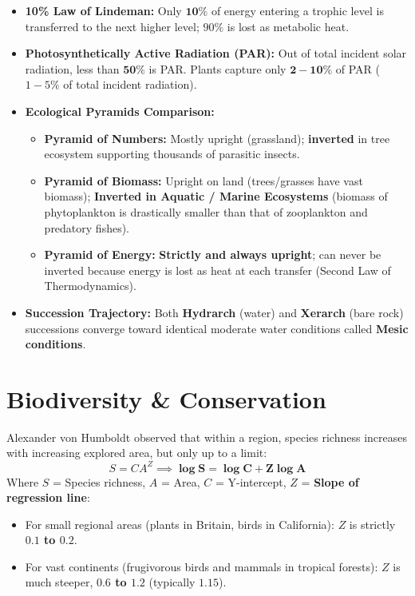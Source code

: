 \documentclass[10pt,a4paper]{article}
\begin{document}
\begin{conceptbox}
\begin{itemize}
  \item \textbf{10\% Law of Lindeman:} Only $\mathbf{10\%}$ of energy entering a trophic level is transferred to the next higher level; $90\%$ is lost as metabolic heat.
  \item \textbf{Photosynthetically Active Radiation (PAR):} Out of total incident solar radiation, less than $\mathbf{50\%}$ is PAR. Plants capture only $\mathbf{2-10\%}$ of PAR ($1-5\%$ of total incident radiation).
  \item \textbf{Ecological Pyramids Comparison:}
  \begin{itemize}
    \item \textbf{Pyramid of Numbers:} Mostly upright (grassland); \textbf{inverted} in tree ecosystem supporting thousands of parasitic insects.
    \item \textbf{Pyramid of Biomass:} Upright on land (trees/grasses have vast biomass); \textbf{Inverted in Aquatic / Marine Ecosystems} (biomass of phytoplankton is drastically smaller than that of zooplankton and predatory fishes).
    \item \textbf{Pyramid of Energy:} \textbf{Strictly and always upright}; can never be inverted because energy is lost as heat at each transfer (Second Law of Thermodynamics).
  \end{itemize}
  \item \textbf{Succession Trajectory:} Both \textbf{Hydrarch} (water) and \textbf{Xerarch} (bare rock) successions converge toward identical moderate water conditions called \textbf{Mesic conditions}.
\end{itemize}
\end{conceptbox}

\section{Biodiversity \& Conservation}

\begin{formulabox}
Alexander von Humboldt observed that within a region, species richness increases with increasing explored area, but only up to a limit:
\begin{equation}
  S = C A^Z \implies \mathbf{\log S = \log C + Z \log A}
\end{equation}
Where $S$ = Species richness, $A$ = Area, $C$ = Y-intercept, $Z$ = \textbf{Slope of regression line}:
\begin{itemize}
  \item For small regional areas (plants in Britain, birds in California): $Z$ is strictly \textbf{$0.1$ to $0.2$}.
  \item For vast continents (frugivorous birds and mammals in tropical forests): $Z$ is much steeper, \textbf{$0.6$ to $1.2$} (typically \textbf{$1.15$}).
\end{itemize}
\end{formulabox}
\end{document}
